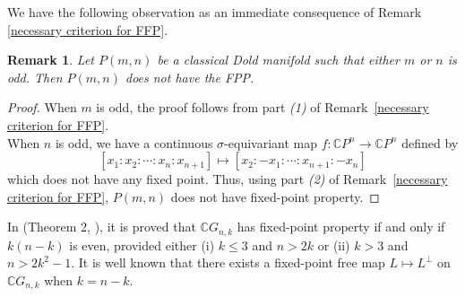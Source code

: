 \documentclass{amsart}
\newtheorem{theorem}{Theorem}[section]
\newtheorem{remark}[theorem]{Remark}
\newcommand{\remref}[1]{Remark~\ref{#1}}
\begin{document}
	
	
	
	
	
	
	
	
	
	We have the following observation as an immediate consequence of Remark \ref{necessary criterion for FFP}.
	
	\begin{remark}
		Let $P(m,n)$ be a classical Dold manifold such that either $m$ or $n$ is odd. Then  
		$P(m,n)$ does not have the FPP.
	\end{remark}
	\begin{proof}
		When $m$ is odd, the proof follows from part \textit{(1)} of \remref{necessary criterion for FFP}. \\ When $n$ is odd, we have a continuous $\sigma$-equivariant map  $f:\mathbb CP^n\to \mathbb CP^n$ defined by 
		\[
		[x_1:x_2:\cdots:x_n:x_{n+1}]\mapsto [ x_2:- x_1:\cdots: x_{n+1}:- x_{n}]
		\] which does not have any fixed point.
		Thus, using part \textit{(2)} of \remref{necessary criterion for FFP}, $P(m,n)$ does not have fixed-point property.
	\end{proof}
	\fi
	
	

	
	
	
	
	\iffalse
	In (Theorem 2, \cite{glover-homer}), it is proved that $\mathbb CG_{n,k}$ has fixed-point property if and only if $k(n-k)$ is even, provided either (i) $k\leq 3$ and $n>2k$ or (ii) $k>3$ and $n> 2k^2-1$.
	It is well known that there exists a fixed-point free map   $ L \mapsto L^\perp   $ on   $ \mathbb{C}G_{n,k}   $ when   $ k = n - k   $.
	
\end{document}
